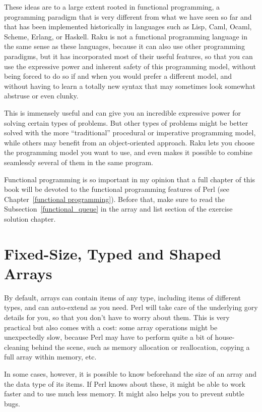 These ideas are to a large extent rooted in functional 
programming, a programming paradigm that is very different 
from what we have seen so far and that has been implemented 
historically in languages such as Lisp, Caml, Ocaml, Scheme, 
Erlang, or Haskell. Raku is not a functional 
programming language in the same sense as these languages, 
because it can also use other programming paradigms, 
but it has incorporated most of their useful features, so 
that you can use the expressive power and inherent safety 
of this programming model, without being forced to do so 
if and when you would prefer a different model, and
without having to learn a totally new syntax that may 
sometimes look somewhat abstruse or even clunky.

This is immensely useful and can give you an incredible 
expressive power for solving certain types of problems. But 
other types of problems might be better solved with the more 
``traditional'' procedural or imperative programming model, 
while others may benefit from an object-oriented approach. Raku 
lets you choose the programming model you want to use, and even 
makes it possible to combine seamlessly several of them in the 
same program.

Functional programming is so important in my opinion that a full chapter 
of this book will be devoted to the functional programming 
features of Perl (see Chapter~\ref{functional programming}). 
Before that, make sure to read the Subsection~\ref{functional_queue} 
in the array and list section of the exercise solution chapter.

\section{Fixed-Size, Typed and Shaped Arrays}

By default, arrays can contain items of any type, including 
items of different types, and can auto-extend as you need. 
Perl will take care of the underlying gory details for you, 
so that you don't have to worry about them. This is very 
practical but also comes with a cost: some array 
operations might be unexpectedly slow, because Perl may 
have to perform quite a bit of house-cleaning behind the 
scene, such as memory allocation or reallocation, copying 
a full array within memory, etc.

In some cases, however, it is possible to know beforehand 
the size of an array and the data type of its items. If 
Perl knows about these, it might be able to work faster and 
to use much less memory. It might also helps you 
to prevent subtle bugs.

